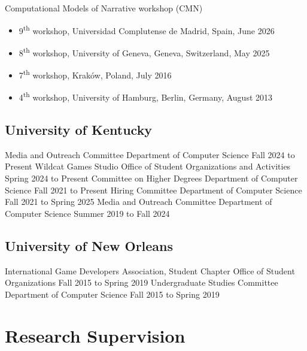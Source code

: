 \documentclass{cv}
\begin{document}
\noindent Computational Models of Narrative workshop (CMN)
\begin{itemize}
	\item 9\textsuperscript{th} workshop, Universidad Complutense de Madrid, Spain, June 2026
	\item 8\textsuperscript{th} workshop, University of Geneva, Geneva, Switzerland, May 2025
	\item 7\textsuperscript{th} workshop, Kraków, Poland, July 2016
	\item 4\textsuperscript{th} workshop, University of Hamburg, Berlin, Germany, August 2013
\end{itemize}

\subsection*{University of Kentucky}
	{Media and Outreach Committee}
	{Department of Computer Science}
	{Fall 2024 to Present}
	{Wildcat Games Studio}
	{Office of Student Organizations and Activities}
	{Spring 2024 to Present}
	{Committee on Higher Degrees}
	{Department of Computer Science}
	{Fall 2021 to Present}
	{Hiring Committee}
	{Department of Computer Science}
	{Fall 2021 to Spring 2025}
	{Media and Outreach Committee}
	{Department of Computer Science}
	{Summer 2019 to Fall 2024}

\subsection*{University of New Orleans}
	{International Game Developers Association, Student Chapter}
	{Office of Student Organizations}
	{Fall 2015 to Spring 2019}
	{Undergraduate Studies Committee}
	{Department of Computer Science}
	{Fall 2015 to Spring 2019}


\section*{Research Supervision}
\end{document}

